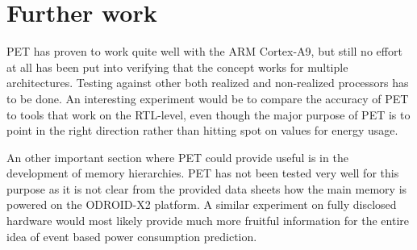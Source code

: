 \section{Further work}

PET has proven to work quite well with the ARM Cortex-A9, but still no effort at
all has been put into verifying that the concept works for multiple
architectures.  Testing against other both realized and non-realized processors
has to be done. An interesting experiment would be to compare the accuracy of
PET to tools that work on the RTL-level, even though the major purpose of PET is
to point in the right direction rather than hitting spot on values for energy
usage.

An other important section where PET could provide useful is in the development of memory
hierarchies. PET has not been tested very well for this purpose as it is not clear from
the provided data sheets how the main memory is powered on the ODROID-X2 platform. A similar
experiment on fully disclosed hardware would most likely provide much more fruitful information
for the entire idea of event based power consumption prediction.


